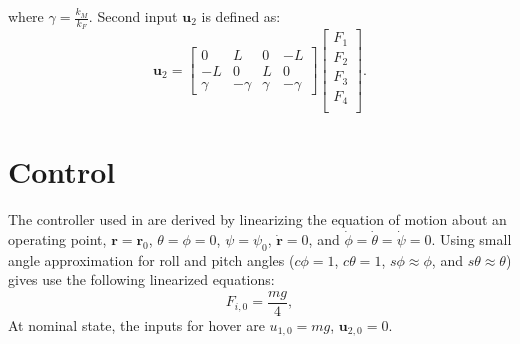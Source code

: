 \documentclass[conference,onecolumn,10pt]{IEEEtran}
\begin{document}
where $\gamma = \frac{k_M}{k_F}$. Second input  $\textbf{u}_2$ is defined as: $$ \textbf{u}_2 = 
\begin{bmatrix}
0 & L & 0 & -L \\
-L & 0 & L & 0 \\
\gamma & -\gamma & \gamma & -\gamma
\end{bmatrix}  \begin{bmatrix}
F_1\\
F_2\\
F_3\\
F_4 \\
\end{bmatrix}.$$

\section{Control}
The controller used in \cite{mellinger2011minimum, michael2010grasp} are derived by linearizing the equation of motion about an operating point, $\textbf{r} = \textbf{r}_0$, $\theta = \phi = 0$, $\psi = \psi_0$, $\dot{\textbf{r}} = 0$, and $\dot{\phi}= \dot{\theta} = \dot{\psi} = 0$. Using small angle approximation for roll and pitch angles ($c\phi = 1$, $c\theta = 1$, $s\phi \approx \phi$, and $s\theta \approx \theta$) gives use the following linearized equations:
\begin{equation}
F_{i,0} = \frac{mg}{4},
\end{equation}
At nominal state, the inputs for hover are $u_{1,0} = mg$, $\textbf{u}_{2,0} = 0$.
\end{document}

